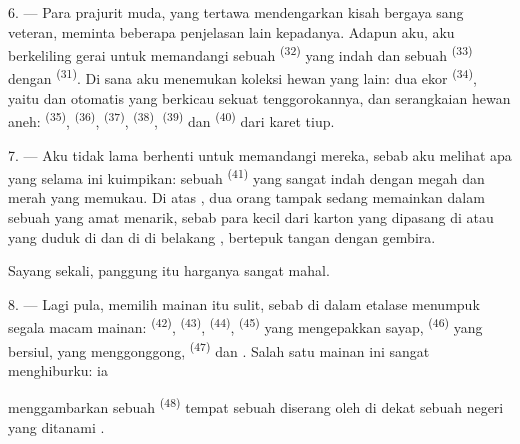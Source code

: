 6. --- Para prajurit muda, yang tertawa mendengarkan kisah bergaya
sang veteran, meminta beberapa penjelasan lain kepadanya. Adapun aku,
aku berkeliling gerai untuk memandangi sebuah 
\textsuperscript{(32)} yang indah dan sebuah 
\textsuperscript{(33)} dengan 
\textsuperscript{(31)}. Di sana aku menemukan koleksi hewan yang lain:
dua ekor  \textsuperscript{(34)}, yaitu
 dan  otomatis yang
berkicau sekuat tenggorokannya, dan serangkaian hewan aneh:
 \textsuperscript{(35)}, 
\textsuperscript{(36)},  \textsuperscript{(37)},
 \textsuperscript{(38)}, 
\textsuperscript{(39)} dan  \textsuperscript{(40)}
dari karet tiup.

7. --- Aku tidak lama berhenti untuk memandangi mereka, sebab aku
melihat apa yang selama ini kuimpikan: sebuah  \textsuperscript{(41)} yang sangat indah dengan
 megah dan  merah yang memukau. Di atas
, dua orang  tampak sedang memainkan
 dalam sebuah  yang amat menarik, sebab
para  kecil dari karton yang dipasang di
 atau yang duduk di  dan di
 di belakang , bertepuk tangan
dengan gembira.

Sayang sekali, panggung itu harganya sangat mahal.

8. --- Lagi pula, memilih mainan itu sulit, sebab di dalam etalase
menumpuk segala macam mainan: 
\textsuperscript{(42)},  \textsuperscript{(43)},
 \textsuperscript{(44)}, 
\textsuperscript{(45)} yang mengepakkan sayap, 
\textsuperscript{(46)} yang bersiul,  yang
menggonggong,  \textsuperscript{(47)} dan
. Salah satu mainan ini sangat
menghiburku: ia


menggambarkan sebuah  \textsuperscript{(48)}
tempat sebuah  diserang oleh  di
dekat sebuah negeri yang ditanami .

